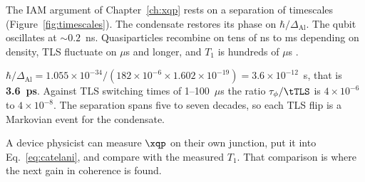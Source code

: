 The IAM argument of Chapter~\ref{ch:xqp} rests on a separation of timescales
(Figure~\ref{fig:timescales}). The condensate restores its phase on $\hbar/\Delta_{\mathrm{Al}}$.
The qubit oscillates at $\sim0.2$~ns. Quasiparticles recombine on tens of ns to ms depending
on density, TLS fluctuate on $\mu$s and longer, and $T_1$ is hundreds of $\mu$s \observed.

\begin{checkbox}
$\hbar/\Delta_{\mathrm{Al}}=1.055\times10^{-34}/(182\times10^{-6}\times1.602\times10^{-19})=3.6\times10^{-12}$~s,
that is \textbf{3.6~ps}. Against TLS switching times of 1--100~$\mu$s the ratio $\tau_\phi/\tTLS$ is
$4\times10^{-6}$ to $4\times10^{-8}$. The separation spans five to seven decades, so each TLS flip is a
Markovian event for the condensate. \calc
\end{checkbox}

A device physicist can measure $\xqp$ on their own junction, put it into Eq.~\eqref{eq:catelani}, and compare with the measured $T_1$. That comparison is where the next gain in coherence is found.
